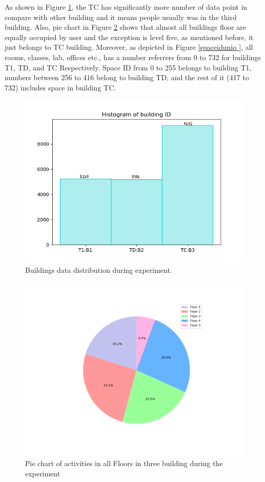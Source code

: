 \documentclass[../UNBThesis2.tex]{subfiles}
\begin{document}
As shown in Figure \ref{bdd}, the TC has significantly more number of data point in compare with other building  and it means people usually was in the third building. Also, pie chart in Figure \ref{Pfloor} shows that almost all buildings floor are equally occupied by user and the exception is level five, as mentioned before, it just belongs to TC building. Moreover, as depicted in Figure \ref{spaceiduniq }, all rooms, classes, lab, offices etc., has a number referrers from 0 to 732 for  buildings T1, TD, and TC Respectively. Space ID from 0 to 255 belongs to building T1, numbers between 256 to 416 belong to building TD, and the rest of it (417 to 732) includes space in building TC.



\begin{figure}
    \centering
    \includegraphics[width = 12 cm]{image/Chapters/Chapter6/buidlingID.png}
    \caption{Buildings data distribution during experiment. }
    \label{bdd}
\end{figure}






\begin{figure}
    \centering
    \includegraphics[width = 12 cm]{image/Chapters/Chapter6/floors.png}
    \caption{Pie chart of activities in all Floors in three building during the experiment }
    \label{Pfloor}
\end{figure}
\end{document}
